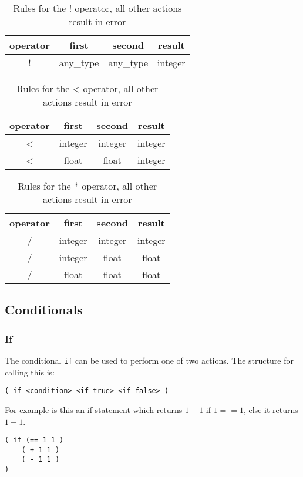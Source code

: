 \begin{table}[h!]
\begin{center}
\begin{tabular}{ |c|c|c|c| }
 \hline
 operator & first & second & result   \\ \hline
  ! & any\_type & any\_type & integer \\ \hline
\end{tabular}
\caption{Rules for the ! operator, all other actions result in error}
\end{center}
\end{table}

\begin{table}[h!]
\begin{center}
\begin{tabular}{ |c|c|c|c| }
 \hline
 operator & first & second & result   \\ \hline
  < & integer & integer & integer \\ \hline
  < & float & float & integer \\ \hline
\end{tabular}
\caption{Rules for the < operator, all other actions result in error}
\end{center}
\end{table}

\begin{table}[h!]
\begin{center}
\begin{tabular}{ |c|c|c|c| }
 \hline
 operator & first & second & result   \\ \hline
 / & integer & integer & integer   \\ \hline
 / & integer & float & float\\ 	\hline
 / & float & float & float \\ \hline
\end{tabular}
\caption{Rules for the * operator, all other actions result in error}
\end{center}
\end{table}


\subsection{Conditionals}

\subsubsection{If}

The conditional \texttt{if} can be used to perform one of two actions. 
The structure for calling this is: 
\begin{lstlisting}
( if <condition> <if-true> <if-false> ) 
\end{lstlisting}
For example is this an if-statement which returns $1 + 1 $ if $1 == 1$, else it returns $1 - 1$.
\begin{lstlisting}
( if (== 1 1 ) 
	( + 1 1 )
	( - 1 1 )
)
\end{lstlisting}

